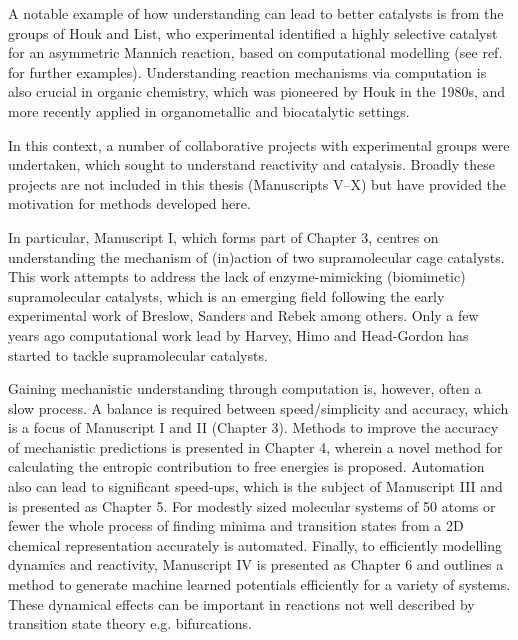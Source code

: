 \documentclass[../main.tex]{subfiles}
\begin{document}
A notable example of how understanding can lead to better catalysts is from the groups of Houk and List, who experimental identified a highly selective catalyst for an asymmetric Mannich reaction,\cite{Mitsumori2006} based on computational modelling (see ref. \cite{Houk2008} for  further examples).\cite{Cheong2006} Understanding reaction mechanisms via computation is also crucial in organic chemistry, which was pioneered by Houk in the 1980s\cite{Houk1986}, and more recently applied in organometallic\cite{Ardkhean2020} and biocatalytic\cite{PlanasIglesias2021} settings. 

In this context, a number of collaborative projects with experimental groups were undertaken, which sought to understand reactivity and catalysis. Broadly these projects are not included in this thesis (Manuscripts \RN{5}--\RN{10}) but have provided the motivation for methods developed here.

In particular, Manuscript \RN{1}, which forms part of  Chapter 3, centres on understanding the mechanism of (in)action of two supramolecular cage catalysts. This work attempts to address the lack of enzyme-mimicking (biomimetic) supramolecular catalysts, which is an emerging field following the early experimental work of Breslow,\cite{Breslow1998}   Sanders\cite{Sanders1998} and Rebek\cite{Santamaria1999} among others. Only a few years ago computational work lead by Harvey\cite{Daver2017, Daver2018}, Himo\cite{Brea2019} and Head-Gordon\cite{Welborn2020} has started to tackle supramolecular catalysts.

Gaining mechanistic understanding through computation is, however, often a slow process. A balance is required between speed/simplicity and accuracy, which is a focus of Manuscript \RN{1} and \RN{2} (Chapter 3). Methods to improve the accuracy of mechanistic predictions is presented in Chapter 4, wherein a novel method for calculating the entropic contribution to free energies is proposed. Automation also can lead to significant speed-ups, which is the subject of Manuscript \RN{3} and is presented as Chapter 5. For modestly sized molecular systems of 50 atoms or fewer the whole process of finding minima and transition states from a 2D chemical representation accurately is automated. Finally, to efficiently modelling dynamics and reactivity, Manuscript \RN{4} is presented as Chapter 6 and outlines a method to generate machine learned potentials efficiently for a variety of systems. These dynamical effects can be important in reactions not well described by transition state theory e.g. bifurcations.\cite{Feng2021} 
\end{document}
